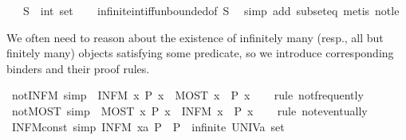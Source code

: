\begin{isabellebody}
\ \ \ S\ {\isacharcolon}{\isacharcolon}\ {\isachardoublequoteopen}int\ set{\isachardoublequoteclose}\isanewline
%
\isadelimproof
\ \ %
\endisadelimproof
%
\isatagproof
{}\isamarkupfalse%
\ infinite{\isacharunderscore}int{\isacharunderscore}iff{\isacharunderscore}unbounded{\isacharbrackleft}of\ S{\isacharbrackright}\ \isamarkupfalse%
\ {\isacharparenleft}simp\ add{\isacharcolon}\ subset{\isacharunderscore}eq{\isacharparenright}\ {\isacharparenleft}metis\ not{\isacharunderscore}le{\isacharparenright}%
\endisatagproof
{\isafoldproof}%
%
\isadelimproof
%
\endisadelimproof
%
\isadelimdocument
%
\endisadelimdocument
%
\isatagdocument
%
\isamarkuptrue%
%
\endisatagdocument
{\isafolddocument}%
%
\isadelimdocument
%
\endisadelimdocument
%
\begin{isamarkuptext}%
We often need to reason about the existence of infinitely many
  (resp., all but finitely many) objects satisfying some predicate, so
  we introduce corresponding binders and their proof rules.%
\end{isamarkuptext}\isamarkuptrue%
\isamarkupfalse%
\ not{\isacharunderscore}INFM\ {\isacharbrackleft}simp{\isacharbrackright}{\isacharcolon}\ {\isachardoublequoteopen}{\isasymnot}\ {\isacharparenleft}INFM\ x{\isachardot}\ P\ x{\isacharparenright}\ {\isasymlongleftrightarrow}\ {\isacharparenleft}MOST\ x{\isachardot}\ {\isasymnot}\ P\ x{\isacharparenright}{\isachardoublequoteclose}\isanewline
%
\isadelimproof
\ \ %
\endisadelimproof
%
\isatagproof
{}\isamarkupfalse%
\ {\isacharparenleft}rule\ not{\isacharunderscore}frequently{\isacharparenright}%
\endisatagproof
{\isafoldproof}%
%
\isadelimproof
\isanewline
%
\endisadelimproof
\isanewline
{}\isamarkupfalse%
\ not{\isacharunderscore}MOST\ {\isacharbrackleft}simp{\isacharbrackright}{\isacharcolon}\ {\isachardoublequoteopen}{\isasymnot}\ {\isacharparenleft}MOST\ x{\isachardot}\ P\ x{\isacharparenright}\ {\isasymlongleftrightarrow}\ {\isacharparenleft}INFM\ x{\isachardot}\ {\isasymnot}\ P\ x{\isacharparenright}{\isachardoublequoteclose}\isanewline
%
\isadelimproof
\ \ %
\endisadelimproof
%
\isatagproof
{}\isamarkupfalse%
\ {\isacharparenleft}rule\ not{\isacharunderscore}eventually{\isacharparenright}%
\endisatagproof
{\isafoldproof}%
%
\isadelimproof
\isanewline
%
\endisadelimproof
\isanewline
{}\isamarkupfalse%
\ INFM{\isacharunderscore}const\ {\isacharbrackleft}simp{\isacharbrackright}{\isacharcolon}\ {\isachardoublequoteopen}{\isacharparenleft}INFM\ x{\isacharcolon}{\isacharcolon}{\isacharprime}a{\isachardot}\ P{\isacharparenright}\ {\isasymlongleftrightarrow}\ P\ {\isasymand}\ infinite\ {\isacharparenleft}UNIV{\isacharcolon}{\isacharcolon}{\isacharprime}a\ set{\isacharparenright}{\isachardoublequoteclose}\isanewline

\end{isabellebody}
